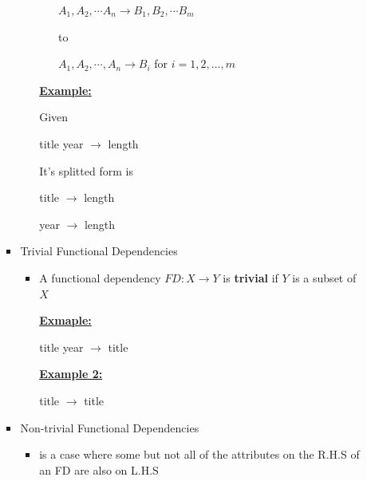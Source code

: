 \documentclass[12pt]{article}
\begin{document}
\begin{enumerate}[1.]
\begin{enumerate}[a)]
\begin{itemize}
\begin{itemize}
\begin{itemize}
                    $A_1,A_2,\cdots A_n \to B_1,B_2,\cdots B_m$

                    to

                    $A_1,A_2,\cdots,A_n \to B_i$ for $i = 1,2,...,m$

                \end{itemize}

                \bigskip

                \underline{\textbf{Example:}}

                \bigskip

                Given

                \bigskip

                title year $\to$ length

                \bigskip

                It's splitted form is

                \bigskip

                title $\to$ length

                year $\to$ length
            \end{itemize}

            \item Trivial Functional Dependencies

            \bigskip

            \begin{itemize}
                \item A functional dependency $FD: X \to Y$ is \textbf{trivial}
                if $Y$ is a subset of $X$

                \bigskip

                \underline{\textbf{Exmaple:}}

                \bigskip

                title year $\to$ title

                \bigskip

                \underline{\textbf{Example 2:}}

                \bigskip

                title $\to$ title

            \end{itemize}

            \item Non-trivial Functional Dependencies
            \begin{itemize}
                \item is a case where some but not all of the attributes on the R.H.S
                of an FD are also on L.H.S


\end{itemize}
\end{itemize}
\end{enumerate}
\end{enumerate}
\end{document}
